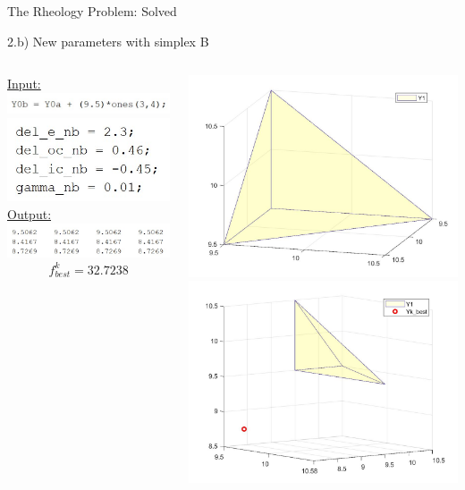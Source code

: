 \documentclass{beamer}
\begin{document}
\begin{frame}{The Rheology Problem: Solved}
\begin{block}{2.b) New parameters with simplex B}
\begin{columns}
\begin{column}{0.35\linewidth}
	\underline{Input:}\\
	\includegraphics[width=0.75\linewidth]{Y0b}\\
	\includegraphics[width=0.45\linewidth]{NewParamsB}\\
	\vspace{0.65cm}
	\underline{Output:}\\
	\includegraphics[width=0.95\linewidth]{1bSimplex}
	$$f^k_{best} = 32.7238$$
	\vspace{0.1cm}
\end{column}
\begin{column}{0.63\linewidth}
	\includegraphics[width=0.45\linewidth]{Simplex2}\\
	\vspace{5mm}
	\includegraphics[width=0.45\linewidth]{1bSimplexPlot}
\end{column}
\end{columns}
\end{block}
\end{frame}
\end{document}
